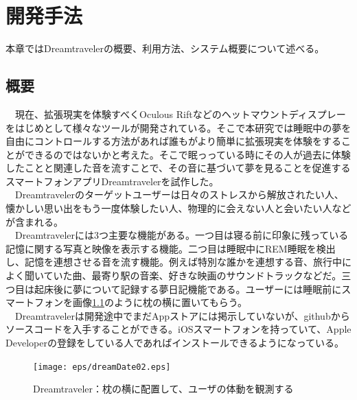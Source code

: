 \chapter{開発手法}
\label{chap:coding}

本章ではDreamtravelerの概要、利用方法、システム概要について述べる。

\section{概要}
　現在、拡張現実を体験すべくOculous Riftなどのヘットマウントディスプレーをはじめとして様々なツールが開発されている。そこで本研究では睡眠中の夢を自由にコントロールする方法があれば誰もがより簡単に拡張現実を体験をすることができるのではないかと考えた。そこで眠っっている時にその人が過去に体験したことと関連した音を流すことで、その音に基づいて夢を見ることを促進するスマートフォンアプリDreamtravelerを試作した。\\
　Dreamtravelerのターゲットユーザーは日々のストレスから解放されたい人、懐かしい思い出をもう一度体験したい人、物理的に会えない人と会いたい人などが含まれる。\\
　Dreamtravelerには3つ主要な機能がある。一つ目は寝る前に印象に残っている記憶に関する写真と映像を表示する機能。二つ目は睡眠中にREM睡眠を検出し、記憶を連想させる音を流す機能。例えば特別な誰かを連想する音、旅行中によく聞いていた曲、最寄り駅の音楽、好きな映画のサウンドトラックなどだ。三つ目は起床後に夢について記録する夢日記機能である。ユーザーには睡眠前にスマートフォンを画像\ref{DreamtravelerImage}のように枕の横に置いてもらう。\\
　Dreamtravelerは開発途中でまだAppストアには掲示していないが、githubからソースコードを入手することができる。iOSスマートフォンを持っていて、Apple Developerの登録をしている人であればインストールできるようになっている。

\begin{figure}[htbp]
\begin{center}
\texttt{[image: eps/dreamDate02.eps]}
\caption{Dreamtraveler：枕の横に配置して、ユーザの体動を観測する}
\label{DreamtravelerImage}
\end{center}
\end{figure}

